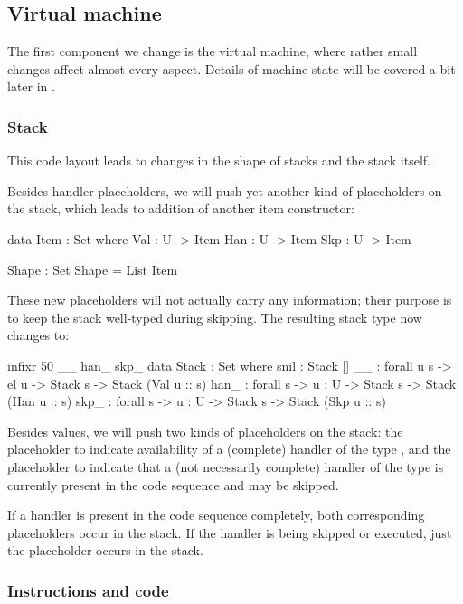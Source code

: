 \subsection{Virtual machine}

The first component we change is the virtual machine, where rather small
changes affect almost every aspect. Details of machine state will be covered
a bit later in .

\subsubsection{Stack}

This code layout leads to changes in the shape of stacks and the stack itself.

Besides handler placeholders, we will push yet another kind of placeholders on
the stack, which leads to addition of another item constructor:
\begin{code}
  data Item : Set where
    Val : U -> Item
    Han : U -> Item
    Skp : U -> Item

  Shape : Set
  Shape = List Item
\end{code}
\noindent These new placeholders will not actually carry any information; their
purpose is to keep the stack well-typed during skipping. The resulting stack type
now changes to:
\begin{code}
  infixr 50 _\scons\_ han\scons\_ skp\scons\_
  data Stack : Set where
    snil : Stack []
    _\scons\_ : forall {u s} -> el u -> Stack s -> Stack (Val u :: s)
    han\scons\_ : forall {s} -> {u : U} -> Stack s -> Stack (Han u :: s)
    skp\scons\_ : forall {s} -> {u : U} -> Stack s -> Stack (Skp u :: s)
\end{code}
\noindent Besides values, we will push two kinds of placeholders on the stack:
the placeholder  to indicate availability of a (complete) handler
of the type , and the placeholder  to indicate that a
(not necessarily complete) handler of the type  is currently present
in the code sequence and may be skipped.

If a handler is present in the code sequence completely, both corresponding
placeholders occur in the stack. If the handler is being skipped or executed,
just the  placeholder occurs in the stack.

\subsubsection{Instructions and code}

